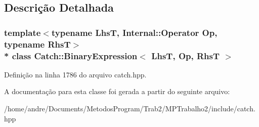 \subsection{Descrição Detalhada}
\subsubsection*{template$<$typename LhsT, Internal\+::\+Operator Op, typename RhsT$>$\\*
class Catch\+::\+Binary\+Expression$<$ Lhs\+T, Op, Rhs\+T $>$}



Definição na linha 1786 do arquivo catch.\+hpp.



A documentação para esta classe foi gerada a partir do seguinte arquivo\+:\begin{DoxyCompactItemize}
\item 
/home/andre/\+Documents/\+Metodos\+Program/\+Trab2/\+M\+P\+Trabalho2/include/catch.\+hpp\end{DoxyCompactItemize}
